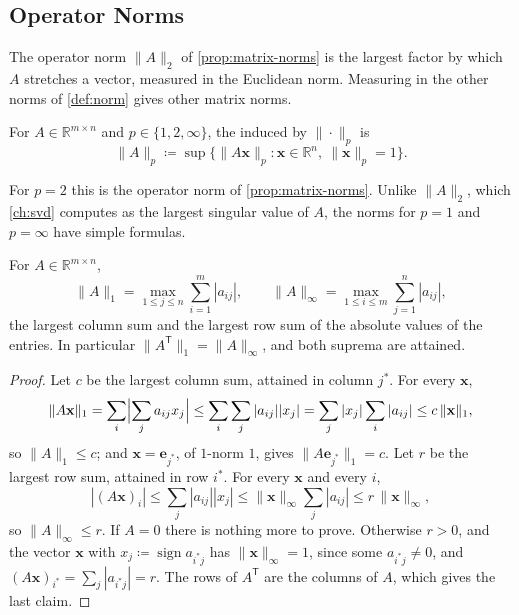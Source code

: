 \subsection{Operator Norms}

The operator norm $\|A\|_2$ of \cref{prop:matrix-norms} is the largest factor by which $A$ stretches a vector, measured in the Euclidean norm. Measuring in the other norms of \cref{def:norm} gives other matrix norms.

\begin{definition}
\label{def:operator-norm}
For $A\in\mathbb R^{m\times n}$ and $p\in\{1,2,\infty\}$, the  induced by $\|\cdot\|_p$ is
\[
\|A\|_p\coloneqq\sup\bigl\{\|A\mathbf x\|_p: \mathbf x\in\mathbb R^n,\ \|\mathbf x\|_p=1\bigr\}.
\]
\end{definition}

For $p=2$ this is the operator norm of \cref{prop:matrix-norms}. Unlike $\|A\|_2$, which \cref{ch:svd} computes as the largest singular value of $A$, the norms for $p=1$ and $p=\infty$ have simple formulas.

\begin{theorem}
\label{thm:norm-formulas}
For $A\in\mathbb R^{m\times n}$,
\[
\|A\|_1=\max_{1\le j\le n}\sum_{i=1}^m|a_{ij}|,\qquad\|A\|_\infty=\max_{1\le i\le m}\sum_{j=1}^n|a_{ij}| ,
\]
the largest column sum and the largest row sum of the absolute values of the entries. In particular $\|A^{\mathsf T}\|_1=\|A\|_\infty$, and both suprema are attained.
\end{theorem}

\begin{proof}
Let $c$ be the largest column sum, attained in column $j^*$. For every $\mathbf x$,
\[
\|A\mathbf x\|_1=\sum_i\Bigl|\sum_ja_{ij}x_j\Bigr|\le\sum_i\sum_j|a_{ij}||x_j|=\sum_j|x_j|\sum_i|a_{ij}|\le c\,\|\mathbf x\|_1 ,
\]
so $\|A\|_1\le c$; and $\mathbf x=\mathbf e_{j^*}$, of $1$-norm $1$, gives $\|A\mathbf e_{j^*}\|_1=c$. Let $r$ be the largest row sum, attained in row $i^*$. For every $\mathbf x$ and every $i$,
\[
|(A\mathbf x)_i|\le\sum_j|a_{ij}||x_j|\le\|\mathbf x\|_\infty\sum_j|a_{ij}|\le r\,\|\mathbf x\|_\infty ,
\]
so $\|A\|_\infty\le r$. If $A=0$ there is nothing more to prove. Otherwise $r>0$, and the vector $\mathbf x$ with $x_j\coloneqq\operatorname{sign}a_{i^*j}$ has $\|\mathbf x\|_\infty=1$, since some $a_{i^*j}\ne0$, and $(A\mathbf x)_{i^*}=\sum_j|a_{i^*j}|=r$. The rows of $A^{\mathsf T}$ are the columns of $A$, which gives the last claim.
\end{proof}

